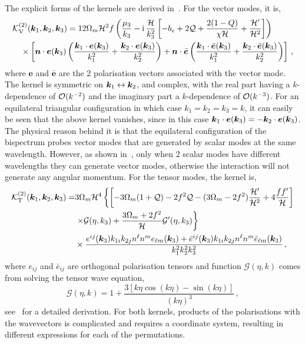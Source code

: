 The explicit forms of the kernels are derived in~\cite{Jolicoeur:2018blf}. For the vector modes, it is, 
\begin{align}
	&\mathcal{K}^{(2)}_\mathrm{V}(\bm {k}_1,\bm {k}_2,\bm {k}_3) = 12 \Omega_m \mathcal{H}^2 f \left( \frac{\mu_3}{k_3} - \mathrm{i\,} \frac{\mathcal{H}}{k_3^2} \left[ -b_e + 2\mathcal{Q} + \frac{2(1-Q)}{\chi\mathcal{H}} + \frac{\mathcal{H}'}{\mathcal{H}^2} \right]  \right) \nonumber \\
	&\quad\times \left[ \bm {n} \cdot \bm{e}(\bm {k}_3) \left( \frac{\bm {k}_1 \cdot \bm{e}(\bm {k}_3)}{k_1^2} + \frac{\bm {k}_2 \cdot \bm{e}(\bm {k}_3)}{k_2^2} \right) + \bm {n} \cdot \bar{\bm{e}} \left( \frac{\bm {k}_1 \cdot \bar{\bm{e}}(\bm {k}_3) }{k_1^2} +\frac{\bm {k}_2 \cdot \bar{\bm{e}}(\bm {k}_3)}{k_2^2}  \right) \right]\,,
\end{align}
where $\bm{e}$ and $\bar{\bm{e}}$ are the 2 polarisation vectors associated with the vector mode. The kernel is symmetric on $\bm {k}_1 \leftrightarrow \bm {k}_2$, and complex, with the real part having a $k$-dependence of $\mathcal{O}(k^{-2})$ and the imaginary part a $k$-dependence of $\mathcal{O}(k^{-3})$. For an equilateral triangular configuration in which case $k_1 = k_2 = k_3= k$, it can easily be seen that the above kernel vanishes, since in this case $\bm {k}_1 \cdot \bm{e}(\bm {k}_3) = - \bm {k}_2 \cdot \bm{e}(\bm {k}_3)$. The physical reason behind it is that the equilateral configuration of the bispectrum probes vector modes that are generated by scalar modes at the same wavelength. However, as shown in~\cite{Lu:2007cj}, only when 2 scalar modes have different wavelengths they can generate vector modes, otherwise the interaction will not generate any angular momentum.
For the tensor modes, the kernel is, 
\begin{align}
	\mathcal{K}^{(2)}_\mathrm{T}(\bm {k}_1,\bm {k}_2,\bm {k}_3) =& 3 \Omega_m \mathcal{H}^4 \left\{ \left[ - 3 \Omega_m (1 + \mathcal{Q}) - 2 f^2 \mathcal{Q} - (3 \Omega_m - 2 f^2) \frac{\mathcal{H}'}{\mathcal{H}^2} + 4 \frac{f f'}{\mathcal{H}} \right] \right. \nonumber \\
	&\left. \times \mathcal{G}(\eta,k_3) + \frac{3 \Omega_m + 2 f^2}{\mathcal{H}} \mathcal{G}'(\eta, k_3) \right\} \nonumber \\
	&\times \frac{e^{ij}(\bm {k}_3) k_{1i} k_{2j} n^{\ell} n^m e_{\ell m}(\bm {k}_3) + \bar{e}^{ij}(\bm {k}_3) k_{1i} k_{2j} n^{\ell} n^m \bar{e}_{\ell m}(\bm {k}_3)  }{k_1^2 k_2^2 k_3^2}\,,
\end{align}
where $e_{ij}$ and $\bar{e}_{ij}$ are orthogonal polarisation tensors and function $\mathcal{G}(\eta,k)$ comes from solving the tensor wave equation, 
\begin{equation}
	\mathcal{G}(\eta,k) = 1 + \frac{3 \left[ k \eta \cos(k\eta) - \sin(k\eta) \right]}{(k\eta)^3}\,,
\end{equation}
see~\cite{Jolicoeur:2018blf} for a detailed derivation. For both kernels, products of the polarisations with the wavevectors is complicated and requires a coordinate system, resulting in different expressions for each of the permutations.


